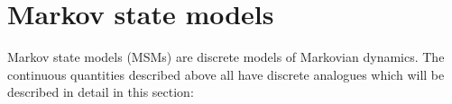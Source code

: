 

\section{Markov state models}

Markov state models (MSMs) are discrete models of Markovian dynamics. The continuous quantities described above all have discrete analogues which will be described in detail in this section: 

